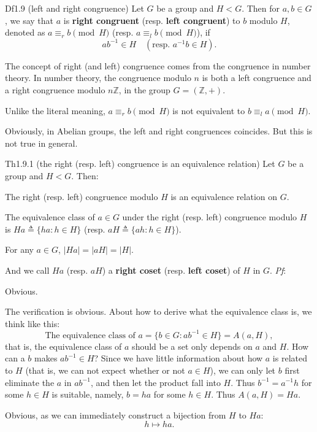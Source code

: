 \documentclass{article}
\begin{document}
\begin{Df}{Df1.9 (left and right congruence)}
    Let $G$ be a group and $H<G$. Then for $a, b\in G$, we say that $a$ is \textbf{right congruent} (resp. \textbf{left congruent}) to $b$ modulo $H$, denoted as $a\equiv_r b\pmod{H}$ (resp. $a\equiv_l b\pmod{H}$), if
    $$ ab^{-1}\in H \quad (\text{resp. } a^{-1}b\in H). $$
\end{Df}

\begin{Rmk}{}
    \begin{compactenum}
        \item The concept of right (and left) congruence comes from the congruence in number theory. \textcolor{Th}{In number theory, the congruence modulo $n$ is both a left congruence and a right congruence modulo $n\mathbb{Z}$, in the group $G = (\mathbb{Z}, +)$.}
        \item Unlike the literal meaning, \textcolor{Th}{$a\equiv_r b\pmod{H}$ is not equivalent to $b\equiv_l a\pmod{H}$}. 
        \item Obviously, \textcolor{Th}{in Abelian groups, the left and right congruences coincides. But this is not true in general.} 
    \end{compactenum}
\end{Rmk}

\begin{Th}{Th1.9.1 (the right (resp. left) congruence is an equivalence relation)}
    Let $G$ be a group and $H<G$. Then:
    \begin{compactenum}
        \item The right (resp. left) congruence modulo $H$ is an equivalence relation on $G$.
        \item The equivalence class of $a\in G$ under the right (resp. left) congruence modulo $H$ is $Ha \triangleq \{ha: h\in H\}$ (resp. $aH \triangleq \{ah: h\in H\}$).
        \item For any $a\in G$, $|Ha| = |aH| = |H|$.
    \end{compactenum}
    \textcolor{Df}{And we call $Ha$ (resp. $aH$) a \textbf{right coset} (resp. \textbf{left coset}) of $H$ in $G$.}
    \tcblower
    \textit{Pf}:
    \begin{compactenum}
        \item Obvious.
        \item The verification is obvious. About how to derive what the equivalence class is, we think like this:
        $$ \text{The equivalence class of } a = \{b\in G: ab^{-1}\in H\} = A(a, H), $$
        that is, the equivalence class of $a$ should be a set only depends on $a$ and $H$. How can a $b$ makes $ab^{-1}\in H$? Since we have little information about how $a$ is related to $H$ (that is, we can not expect whether or not $a\in H$), we can only let $b$ first eliminate the $a$ in $ab^{-1}$, and then let the product fall into $H$. Thus $b^{-1} = a^{-1}h$ for some $h\in H$ is suitable, namely, $b = ha$ for some $h\in H$. Thus $A(a, H) = Ha$.
        \item Obvious, as we can immediately construct a bijection from $H$ to $Ha$:
        $$ h\mapsto ha. $$
    \end{compactenum}
\end{Th}
\end{document}
